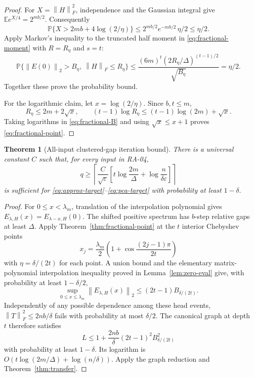\documentclass[11pt]{article}
\newtheorem{theorem}{Theorem}[section]
\theoremstyle{definition}
\newcommand{\Prob}{\mathbb P}
\newcommand{\E}{\mathbb E}
\newcommand{\norm}[1]{\left\lVert #1\right\rVert}
\begin{document}
\begin{proof}
For $X=\norm{H}_F^2$, independence and the Gaussian integral give
$\E e^{X/4}=2^{mb/2}$. Consequently
\[
 \Prob\{X>2mb+4\log(2/\eta)\}
 \leq 2^{mb/2}e^{-mb/2}\,\eta/2\leq\eta/2.
\]
Apply Markov's inequality to the truncated half moment in
\eqref{eq:fractional-moment} with $R=R_\eta$ and $s=t$:
\[
 \Prob\{\norm{E(0)}_2>B_\eta,\ \norm{H}_F\leq R_\eta\}
 \leq\frac{(6m)^t(2R_\eta/\Delta)^{(t-1)/2}}
              {\sqrt{B_\eta}}=\eta/2.
\]
Together these prove the probability bound.

For the logarithmic claim, let $x=\log(2/\eta)$. Since $b,t\leq m$,
\[
 R_\eta\leq2m+2\sqrt{x},\qquad
 (t-1)\log R_\eta
 \leq(t-1)\log(2m)+\sqrt{x}.
\]
Taking logarithms in \eqref{eq:fractional-B} and using
$\sqrt{x}\leq x+1$ proves \eqref{eq:fractional-point}.
\end{proof}

\begin{theorem}[All-input clustered-gap iteration bound]
\label{thm:fractional-q}
There is a universal constant $C$ such that, for every input in RA-04,
\begin{equation}
 q\geq\left\lceil\frac C{\sqrt\varepsilon}
 \left[t\log\frac{2m}{\Delta}
                     +\log\frac n{\delta\varepsilon}\right]\right\rceil
 \label{eq:fractional-q}
\end{equation}
is sufficient for \eqref{eq:approx-target}--\eqref{eq:pca-target}
with probability at least $1-\delta$.
\end{theorem}
\begin{proof}
For $0\leq x<\lambda_m$, translation of the interpolation polynomial gives
$E_{\lambda,H}(x)=E_{\lambda-x,H}(0)$. The shifted positive spectrum has
$b$-step relative gaps at least $\Delta$. Apply
Theorem~\ref{thm:fractional-point} at the $t$ interior Chebyshev points
\[
 x_j=\frac{\lambda_m}{2}
      \left(1+\cos\frac{(2j-1)\pi}{2t}\right)
\]
with $\eta=\delta/(2t)$ for each point. A union bound and the elementary
matrix-polynomial interpolation inequality proved in
Lemma~\ref{lem:zero-eval} give, with probability at least $1-\delta/2$,
\[
 \sup_{0\leq x\leq\lambda_m}\norm{E_{\lambda,H}(x)}_2
       \leq(2t-1)B_{\delta/(2t)}.
\]
Independently of any possible dependence among these head events,
$\norm{T}_F^2\leq2nb/\delta$ fails with probability at most $\delta/2$.
The canonical graph at depth $t$ therefore satisfies
\begin{equation}
 L\leq1+\frac{2nb}{\delta}(2t-1)^2B_{\delta/(2t)}^2
 \label{eq:fractional-L}
\end{equation}
with probability at least $1-\delta$. Its logarithm is
$O(t\log(2m/\Delta)+\log(n/\delta))$. Apply the graph reduction and
Theorem~\ref{thm:transfer}.
\end{proof}
\end{document}

